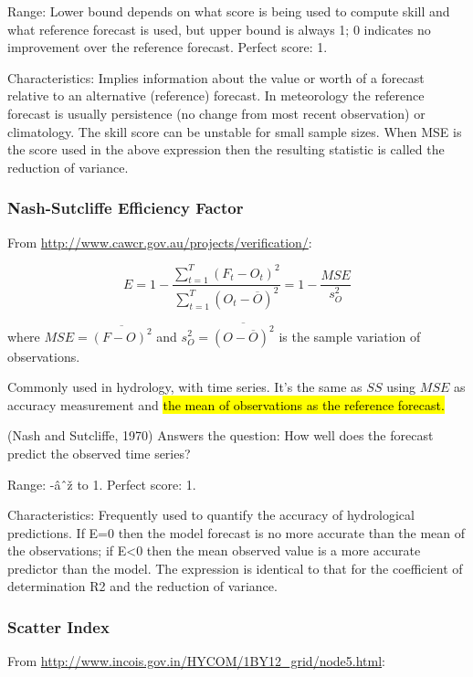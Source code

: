 \documentclass[12pt,a4paper]{article}
\begin{document}
Range: Lower bound depends on what score is being used to compute skill and what reference forecast is used, but upper bound is always 1; 0 indicates no improvement over the reference forecast. Perfect score: 1.

Characteristics: Implies information about the value or worth of a forecast relative to an alternative (reference) forecast. In meteorology the reference forecast is usually persistence (no change from most recent observation) or climatology. The skill score can be unstable for small sample sizes. When MSE is the score used in the above expression then the resulting statistic is called the reduction of variance.

\subsubsection{Nash-Sutcliffe Efficiency Factor} 

From \url{http://www.cawcr.gov.au/projects/verification/}:

\begin{equation}
E = 1 - \frac{ \sum_{t=1}^{T} (F_t - O_t)^2 }{ \sum_{t=1}^{T} (O_t - \overline{O})^2} = 1 - \frac{MSE}{s^2_O}
\end{equation}

where $MSE = \overline{(F-O)^2}$ and $s^2_O = \overline{ (O-\overline{O})^2 }$ is the sample variation of observations.

Commonly used in hydrology, with time series. It's the same as $SS$ using $MSE$ as accuracy measurement and \hl{the mean of observations as the reference forecast.}

(Nash and Sutcliffe, 1970) 
Answers the question: How well does the forecast predict the observed time series?

Range: -âˆž to 1.  Perfect score: 1.

Characteristics: Frequently used to quantify the accuracy of hydrological predictions. If E=0 then the model forecast is no more accurate than the mean of the observations; if E<0 then the mean observed value is a more accurate predictor than the model. The expression is identical to that for the coefficient of determination R2 and the reduction of variance.

\subsubsection{Scatter Index}

From \url{http://www.incois.gov.in/HYCOM/1BY12_grid/node5.html}:
\end{document}

